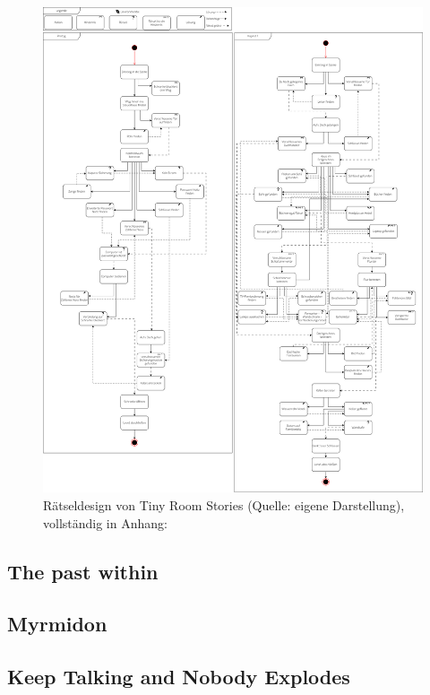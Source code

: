 \begin{figure}[ht]
\centering
\includegraphics[width=1\linewidth]{content/pictures/TinyRoomStoriesUML.png}
\caption{Rätseldesign von Tiny Room Stories (Quelle: eigene Darstellung), vollständig in Anhang: }
\label{fig:trs-uml}
\end{figure}

\subsection{The past within}

\subsection{Myrmidon}

\subsection{Keep Talking and Nobody Explodes}